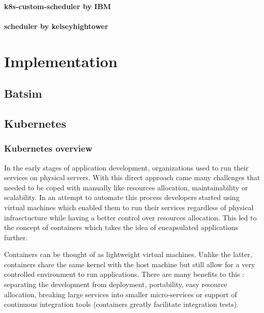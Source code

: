\documentclass[12pt, a4paper]{memoir}
\newcommand*{\captionsource}[2]{%
    \caption[{#1}]{%
        #1%
        \\\hspace{\linewidth}%
	\textbf{Source:} \textit{#2}%
    }%
}
\begin{document}
\subsubsection*{k8s-custom-scheduler by IBM}
\subsubsection*{scheduler by kelseyhightower}

\chapter{Implementation}
\section{Batsim}

\section{Kubernetes}
\subsection*{Kubernetes overview}
In the early stages of application development, organizations used to run their
services on physical servers. With this direct approach came many challenges
that needed to be coped with manually like resources allocation,
maintainability or scalability. In an attempt to automate this process
developers started using virtual machines which enabled them to run their
services regardless of physical infrasctucture while having a better control
over resources allocation.  This led to the concept of containers which takes
the idea of encapsulated applications further.


Containers can be thought of as lightweight virtual machines. Unlike the
latter, containers share the same kernel with the host machine but still allow
for a very controlled environment to run applications. There are many
benefits to this : separating the development from deployment, portability,
easy resource allocation, breaking large services into smaller micro-services
or support of continuous integration tools (containers greatly facilitate
integration tests).\\
\end{document}

